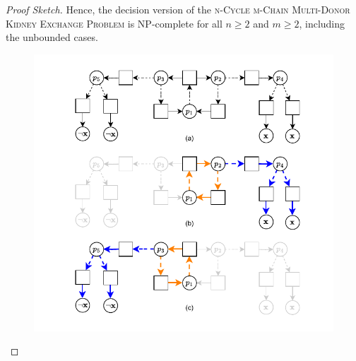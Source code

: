\begin{lemma}
\begin{proof}[Proof Sketch]
Hence, the decision version of the \textsc{n-Cycle m-Chain Multi-Donor Kidney Exchange Problem} is NP-complete for all $n \ge 2$ and $m \ge 2$, including the unbounded cases.

\begin{figure}
    \centering
    \includegraphics{data/sat_reduction_boolean_gadget2.pdf}
    \caption[]{}
    \label{fig:sat_reduction_boolean_gadget2}
\end{figure}

\end{proof}
\end{lemma}



